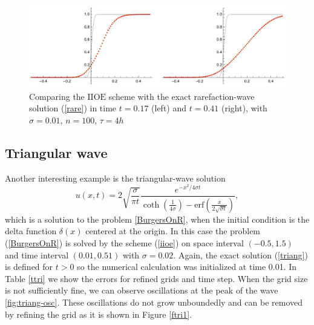 \documentclass[a4paper,12pt,twoside]{report}%
\begin{document}
\begin{figure}[h!]
	\centering
	\includegraphics[width=\textwidth]{figures/rare100}
	\caption{Comparing the $\mathrm{IIOE}$ scheme with the exact rarefaction-wave solution {\rm (\ref{rare})} in time $ t=0.17 $ (left) and $ t = 0.41 $ (right), with $ \sigma=0.01 $, $ n=100 $, $ \tau=4h $}
	\label{fig:rare}
\end{figure}


\subsection{Triangular wave}
Another interesting example is the triangular-wave solution
\begin{equation}
	u(x,t)=2 \sqrt{\frac{\sigma}{\pi t}} \frac{e^{-x^{2}/4\sigma t}}{\coth \left(\frac{1}{4\sigma}\right)-\mathrm{erf} \left(\frac{x}{2\sqrt{\sigma t}}\right)},
	\label{triang}
\end{equation}
which is a solution to the problem \eqref{BurgersOnR}, when the initial condition is the delta function $ \delta(x) $ centered at the origin.
In this case the problem (\ref{BurgersOnR}) is solved by the scheme (\ref{iioe}) on space interval $ (-0.5, 1.5) $ and time interval $ (0.01, 0.51) $ with $ \sigma = 0.02 $. Again, the exact solution (\ref{triang}) is defined for $ t > 0 $ so the numerical calculation was initialized at time 0.01. In Table \ref{ttri} we show the errors for refined grids and time step. When the grid size is not sufficiently fine, we can observe oscillations at the peak of the wave \ref{fig:triang-osc}. These oscillations do not grow unboundedly and can be removed by refining the grid as it is shown in Figure \ref{ftri1}.
\end{document}
